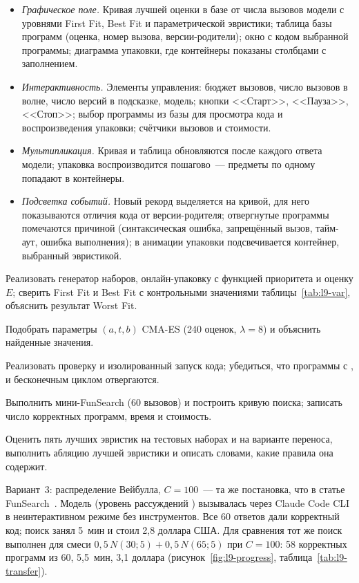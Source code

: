 \begin{itemize}
\item \emph{Графическое поле.} Кривая лучшей оценки в базе от числа вызовов модели с уровнями First Fit, Best Fit и параметрической эвристики; таблица базы программ (оценка, номер вызова, версии-родители); окно с кодом выбранной программы; диаграмма упаковки, где контейнеры показаны столбцами с заполнением.
\item \emph{Интерактивность.} Элементы управления: бюджет вызовов, число вызовов в волне, число версий в подсказке, модель; кнопки <<Старт>>, <<Пауза>>, <<Стоп>>; выбор программы из базы для просмотра кода и воспроизведения упаковки; счётчики вызовов и стоимости.
\item \emph{Мультипликация.} Кривая и таблица обновляются после каждого ответа модели; упаковка воспроизводится пошагово~--- предметы по одному попадают в контейнеры.
\item \emph{Подсветка событий.} Новый рекорд выделяется на кривой, для него показываются отличия кода от версии-родителя; отвергнутые программы помечаются причиной (синтаксическая ошибка, запрещённый вызов, тайм-аут, ошибка выполнения); в анимации упаковки подсвечивается контейнер, выбранный эвристикой.
\end{itemize}

\begin{steps}
\item Реализовать генератор наборов, онлайн-упаковку с функцией приоритета и оценку $E$; сверить
First Fit и Best Fit с контрольными значениями таблицы~\ref{tab:l9-var}, объяснить результат Worst Fit.
\item Подобрать параметры $(a, t, b)$ CMA-ES (240 оценок, $\lambda = 8$) и объяснить найденные значения.
\item Реализовать проверку и изолированный запуск кода; убедиться, что программы с ,
 и бесконечным циклом отвергаются.
\item Выполнить мини-FunSearch (60 вызовов) и построить кривую поиска; записать число корректных
программ, время и стоимость.
\item Оценить пять лучших эвристик на тестовых наборах и на варианте переноса, выполнить абляцию лучшей
эвристики и описать словами, какие правила она содержит.
\end{steps}

Вариант~3: распределение Вейбулла, $C = 100$~--- та же постановка, что в статье FunSearch~\cite{romera2024}.
Модель  (уровень рассуждений ) вызывалась через Claude Code CLI в
неинтерактивном режиме без инструментов. Все 60 ответов дали корректный код; поиск занял 5~мин и стоил
2,8 доллара США. Для сравнения тот же поиск выполнен для смеси $0,5\,N(30; 5) + 0,5\,N(65; 5)$ при
$C = 100$: 58 корректных программ из 60, 5,5~мин, 3,1 доллара (рисунок~\ref{fig:l9-progress},
таблица~\ref{tab:l9-transfer}).

